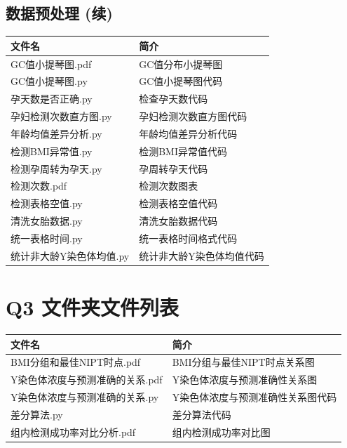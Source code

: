 \documentclass[a4paper, oneside, 12pt]{article}
\begin{document}
\subsection*{数据预处理 (续)}
\begin{table}[H]
    \centering
    \fangsong
    \begin{tabularx}{\textwidth}{>{\RaggedRight}X >{\RaggedRight}X}
        \toprule
        \textbf{文件名}   & \textbf{简介}   \\
        \midrule
        GC值小提琴图.pdf    & GC值分布小提琴图     \\
        GC值小提琴图.py     & GC值小提琴图代码     \\
        孕天数是否正确.py     & 检查孕天数代码       \\
        孕妇检测次数直方图.py   & 孕妇检测次数直方图代码   \\
        年龄均值差异分析.py    & 年龄均值差异分析代码    \\
        检测BMI异常值.py    & 检测BMI异常值代码    \\
        检测孕周转为孕天.py    & 孕周转孕天代码       \\
        检测次数.pdf       & 检测次数图表        \\
        检测表格空值.py      & 检测表格空值代码      \\
        清洗女胎数据.py      & 清洗女胎数据代码      \\
        统一表格时间.py      & 统一表格时间格式代码    \\
        统计非大龄Y染色体均值.py & 统计非大龄Y染色体均值代码 \\
        \bottomrule
    \end{tabularx}
\end{table}

\section*{Q3 文件夹文件列表}
\begin{table}[H]
    \centering
    \fangsong
    \begin{tabularx}{\textwidth}{>{\RaggedRight}X >{\RaggedRight}X}
        \toprule
        \textbf{文件名}       & \textbf{简介}       \\
        \midrule
        BMI分组和最佳NIPT时点.pdf & BMI分组与最佳NIPT时点关系图 \\
        Y染色体浓度与预测准确的关系.pdf & Y染色体浓度与预测准确性关系图   \\
        Y染色体浓度与预测准确的关系.py  & Y染色体浓度与预测准确性关系图代码 \\
        差分算法.py            & 差分算法代码            \\
        组内检测成功率对比分析.pdf    & 组内检测成功率对比图        \\
        \bottomrule
    \end{tabularx}
\end{table}
\end{document}
